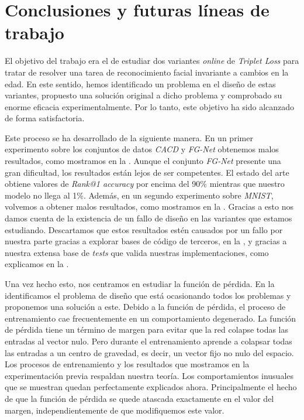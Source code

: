 \chapter{Conclusiones y futuras líneas de trabajo} \label{ich:conclusiones}

El objetivo del trabajo era el de estudiar dos variantes \textit{online} de \textit{Triplet Loss} para tratar de resolver una tarea de reconocimiento facial invariante a cambios en la edad. En este sentido, hemos identificado un problema en el diseño de estas variantes, propuesto una solución original a dicho problema y comprobado su enorme eficacia experimentalmente. Por lo tanto, este objetivo ha sido alcanzado de forma satisfactoria.

Este proceso se ha desarrollado de la siguiente manera. En un primer experimento sobre los conjuntos de datos \textit{CACD} y \textit{FG-Net} obtenemos malos resultados, como mostramos en la . Aunque el conjunto \textit{FG-Net} presente una gran dificultad, los resultados están lejos de ser competentes. El estado del arte obtiene valores de \textit{Rank@1 accuracy} por encima del 90\% mientras que nuestro modelo no llega al 1\%. Además, en un segundo experimento sobre \textit{MNIST}, volvemos a obtener malos resultados, como mostramos en la . Gracias a esto nos damos cuenta de la existencia de un fallo de diseño en las variantes que estamos estudiando. Descartamos que estos resultados estén causados por un fallo por nuestra parte gracias a explorar bases de código de terceros, en la , y gracias a nuestra extensa base de \textit{tests} que valida nuestras implementaciones, como explicamos en la .

Una vez hecho esto, nos centramos en estudiar la función de pérdida. En la  identificamos el problema de diseño que está ocasionando todos los problemas y proponemos una solución a este. Debido a la función de pérdida, el proceso de entrenamiento cae frecuentemente en un comportamiento degenerado. La función de pérdida tiene un término de margen para evitar que la red colapse todas las entradas al vector nulo. Pero durante el entrenamiento aprende a colapsar todas las entradas a un centro de gravedad, es decir, un vector fijo no nulo del espacio. Los procesos de entrenamiento y los resultados que mostramos en la experimentación previa respaldan nuestra teoría. Los comportamientos inusuales que se muestran quedan perfectamente explicados ahora. Principalmente el hecho de que la función de pérdida se quede atascada exactamente en el valor del margen, independientemente de que modifiquemos este valor.

